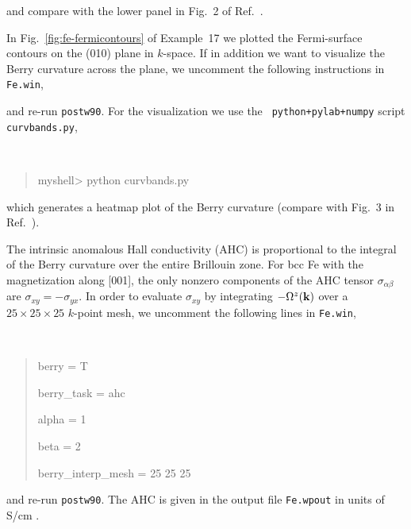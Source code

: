 \documentclass[a4paper,11pt,twoside]{article}
\begin{document}
and compare with the lower panel in Fig.~2 of Ref.~\cite{yao-prl04}.

In Fig.~\ref{fig:fe-fermicontours} of Example~17 we plotted the
Fermi-surface contours on the (010) plane in $k$-space.  If in
addition we want to visualize the Berry curvature across the plane, we
uncomment the following instructions in {\tt Fe.win}, 

and re-run {\tt postw90}.  For the visualization we use the {\tt
  python+pylab+numpy} script {\tt curvbands.py}, 
{\tt
\begin{quote}
myshell> python curvbands.py
\end{quote} }
\smallskip

which generates a heatmap plot of the Berry curvature (compare with
Fig.~3 in Ref.~\cite{yao-prl04}).

The intrinsic anomalous Hall conductivity (AHC) is proportional to the
integral of the Berry curvature over the entire Brillouin zone. For
bcc Fe with the magnetization along [001], the only nonzero components
of the AHC tensor $\sigma_{\alpha\beta}$ are
$\sigma_{xy}=-\sigma_{yx}$.  In order to evaluate $\sigma_{xy}$ by
integrating $-\Omega^z({\bf k})$ over a $25\times 25\times 25$
$k$-point mesh, we uncomment the following lines in {\tt Fe.win},
{\tt
\begin{quote}
berry = T

berry\_task = ahc                

alpha = 1                       

beta = 2

berry\_interp\_mesh = 25 25 25

\end{quote} } 

and re-run {\tt postw90}.  The AHC is given in the output file {\tt Fe.wpout} in
units of S/cm .
\end{document}
